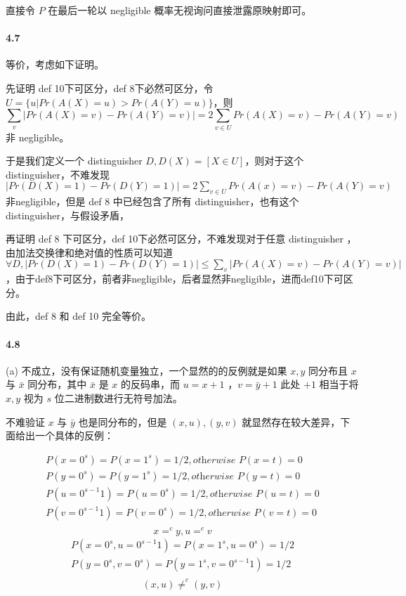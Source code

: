 \documentclass[12pt, a4paper, oneside]{ctexart}
\begin{document}
	直接令 $P$ 在最后一轮以 negligible 概率无视询问直接泄露原映射即可。
	
	\paragraph{4.7}
	
	等价，考虑如下证明。
	
	先证明 def 10下可区分，def 8下必然可区分，令 $U=\{u|Pr(A(X)=u)>Pr(A(Y)=u)\}$，则 $$\sum_v|Pr(A(X)=v)-Pr(A(Y)=v)|=2\sum_{v\in U}Pr(A(X)=v)-Pr(A(Y)=v)$$ 非 negligible。
	
	于是我们定义一个 distinguisher  $D,D(X)=[X\in U]$，则对于这个 distinguisher，不难发现 $|Pr(D(X)=1)-Pr(D(Y)=1)|=2\sum_{v\in U}Pr(A(x)=v)-Pr(A(Y)=v)$ 非negligible，但是 def 8 中已经包含了所有 distinguisher，也有这个distinguisher，与假设矛盾，
	
	再证明 def 8 下可区分，def 10下必然可区分，不难发现对于任意 distinguisher ，由加法交换律和绝对值的性质可以知道 $\forall D, |Pr(D(X)=1)-Pr(D(Y)=1)|\leq \sum_v|Pr(A(X)=v)-Pr(A(Y)=v)|$，由于def8下可区分，前者非negligible，后者显然非negligible，进而def10下可区分。
	
	由此，def 8 和 def 10 完全等价。
	
	\paragraph{4.8}
	(a) 不成立，没有保证随机变量独立，一个显然的的反例就是如果 $x,y$ 同分布且 $x$ 与 $\bar{x}$ 同分布，其中 $\bar{x}$ 是 $x$ 的反码串，而 $u = x+1$ ，$v = \bar{y} + 1$ 此处 $+1$ 相当于将 $x,y$ 视为 $s$ 位二进制数进行无符号加法。
	
	不难验证 $x$ 与 $\bar{y}$ 也是同分布的，但是 $(x,u),(y,v)$ 就显然存在较大差异，下面给出一个具体的反例：
	
	$$
	\begin{aligned}
	P(x=0^s)=P(x=1^s)=1/2,\textit{otherwise } P(x=t)=0\\
	P(y=0^s)=P(y=1^s)=1/2,\textit{otherwise } P(y=t)=0\\
	P(u=0^{s-1}1)=P(u=0^s)=1/2,\textit{otherwise } P(u=t) = 0\\
	P(v=0^{s-1}1)=P(v=0^s)=1/2,\textit{otherwise } P(v=t) = 0\\
	\end{aligned}
	$$
	$$
	x=^c y, u=^c v
	$$
	$$
	\begin{aligned}
	P(x=0^s,u=0^{s-1}1)=P(x=1^s,u=0^s)=1/2\\
	P(y=0^s,v=0^s)=P(y=1^s,v=0^{s-1}1)=1/2\\
	\end{aligned}
	$$
	$$
	(x,u)\neq^c (y,v)
	$$
	
\end{document}

